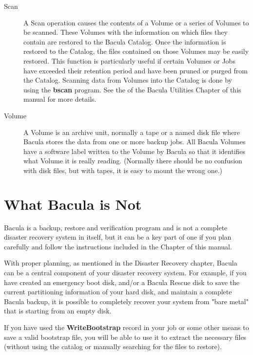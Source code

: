 \begin{description}
\item [Scan]
   A Scan operation causes the contents of a Volume or a series of Volumes
   to be scanned.  These Volumes with the information on which files they
   contain are restored to the Bacula Catalog.  Once the information is
   restored to the Catalog, the files contained on those Volumes may be
   easily restored.  This function is particularly useful if certain
   Volumes or Jobs have exceeded their retention period and have been
   pruned or purged from the Catalog.  Scanning data from Volumes into the
   Catalog is done by using the {\bf bscan} program.  See the  of the Bacula Utilities Chapter of this manual for more
   details.

\item [Volume]
   A Volume is an archive unit, normally a tape or a named disk file where
   Bacula stores the data from one or more backup jobs.  All Bacula Volumes
   have a software label written to the Volume by Bacula so that it
   identifies what Volume it is really reading.  (Normally there should be
   no confusion with disk files, but with tapes, it is easy to mount the
   wrong one.)
\end{description}

\section{What Bacula is Not}

Bacula is a backup, restore and verification program and is not a
complete disaster recovery system in itself, but it can be a key part of one
if you plan carefully and follow the instructions included in the 
 Chapter of this manual. 

With proper planning, as mentioned in the Disaster Recovery chapter,
Bacula can be a central component of your disaster recovery system. For
example, if you have created an emergency boot disk, and/or a Bacula Rescue disk to
save the current partitioning information of your hard disk, and maintain a
complete Bacula backup, it is possible to completely recover your system from
"bare metal" that is starting from an empty disk. 

If you have used the {\bf WriteBootstrap} record in your job or some other
means to save a valid bootstrap file, you will be able to use it to extract
the necessary files (without using the catalog or manually searching for the
files to restore). 

